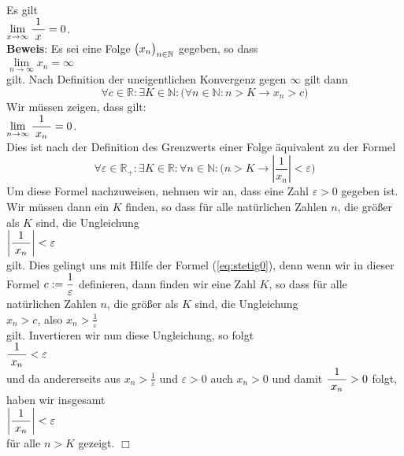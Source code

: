 \example 
Es gilt
\\[0.2cm]
\hspace*{1.3cm}      
$\lim\limits_{x\rightarrow\infty} \displaystyle\frac{\;\displaystyle1\;}{\;\displaystyle x\;} = 0$.
\\[0.2cm]
\textbf{Beweis}:  Es sei eine Folge $\bigl(x_n\bigr)_{n\in\mathbb{N}}$ gegeben, so dass 
\\[0.2cm]
\hspace*{1.3cm}      
$\lim\limits_{n\rightarrow\infty} x_n = \infty$
\\[0.2cm]
gilt.   Nach Definition der uneigentlichen Konvergenz gegen $\infty$ gilt dann
\begin{equation}
  \label{eq:stetig0}  
  \forall c \in \mathbb{R}: \exists K \in \mathbb{N}:\bigl(\forall n \in \mathbb{N}: n > K \rightarrow x_n > c\bigr)
\end{equation}
Wir m\"ussen zeigen, dass gilt:
\\[0.2cm]
\hspace*{1.3cm}
$\displaystyle \lim\limits_{n\rightarrow\infty} \displaystyle\frac{\;\displaystyle1\;}{\;\displaystyle x_n\;} = 0$.
\\[0.2cm]
Dies ist nach der Definition des Grenzwerts einer Folge \"aquivalent zu der Formel
\begin{equation}
  \label{eq:stetig1}
  \forall \varepsilon \in\mathbb{R}_+: \exists K \in \mathbb{R} : \forall n \in \mathbb{N}
  :\bigl(n > K \rightarrow \left|\frac{1}{x_n}\right| < \varepsilon\bigr)
\end{equation}
Um diese Formel nachzuweisen, nehmen wir an, dass eine Zahl $\varepsilon>0$
gegeben ist.  Wir m\"ussen dann ein $K$ finden, so dass f\"ur alle nat\"urlichen Zahlen $n$, die
gr\"o{\ss}er als $K$ sind, die Ungleichung 
\\[0.2cm]
\hspace*{1.3cm} $\left|\displaystyle\frac{\;\displaystyle1\;}{\;\displaystyle x_n\;}\right| < \varepsilon$
\\[0.2cm]
gilt.  Dies gelingt uns mit Hilfe der Formel (\ref{eq:stetig0}), denn wenn wir in dieser Formel
$\displaystyle c := \frac{1}{\varepsilon}$ definieren, dann finden wir eine Zahl $K$, so dass f\"ur alle
nat\"urlichen Zahlen $n$, die
gr\"o{\ss}er als $K$ sind, die Ungleichung  
\\[0.2cm] \hspace*{1.3cm} $\displaystyle x_n > c$, \quad also $\displaystyle x_n > \frac{1}{\varepsilon}$ \\[0.2cm]
gilt.  Invertieren wir nun diese Ungleichung, so folgt
\\[0.2cm]
\hspace*{1.3cm}
$\displaystyle\frac{\;\displaystyle1\;}{\;\displaystyle x_n\;} < \varepsilon$
\\[0.2cm]
und da andererseits aus $x_n > \frac{1}{\varepsilon}$ und $\varepsilon > 0$ auch $x_n > 0$
und damit $\displaystyle\frac{\;\displaystyle1\;}{\;\displaystyle x_n\;} > 0$ folgt, haben wir insgesamt 
\\[0.2cm]
\hspace*{1.3cm}
$\left|\displaystyle\frac{\;\displaystyle1\;}{\;\displaystyle x_n\;}\right| < \varepsilon$
\\[0.2cm]
f\"ur alle $n > K$ gezeigt. \hspace*{\fill} $\Box$
\vspace*{0.3cm}

